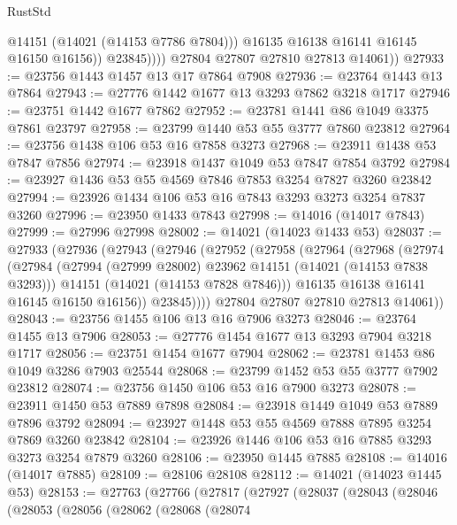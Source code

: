 \begin{lexlean}{RustStd}
\begin{coremodule}
                      @14151
                      (@14021 (@14153 @7786 @7804)))
                    @16135
                    @16138
                    @16141
                    @16145
                    @16150
                    @16156))
                @23845))))
        @27804
        @27807
        @27810
        @27813
        @14061))
@27933 := @23756 @1443 @1457 @13 @17 @7864 @7908
@27936 := @23764 @1443 @13 @7864
@27943 := @27776 @1442 @1677 @13 @3293 @7862 @3218 @1717
@27946 := @23751 @1442 @1677 @7862
@27952 := @23781 @1441 @86 @1049 @3375 @7861 @23797
@27958 := @23799 @1440 @53 @55 @3777 @7860 @23812
@27964 := @23756 @1438 @106 @53 @16 @7858 @3273
@27968 := @23911 @1438 @53 @7847 @7856
@27974 := @23918 @1437 @1049 @53 @7847 @7854 @3792
@27984 := @23927 @1436 @53 @55 @4569 @7846 @7853 @3254 @7827 @3260 @23842
@27994 := @23926 @1434 @106 @53 @16 @7843 @3293 @3273 @3254 @7837 @3260
@27996 := @23950 @1433 @7843
@27998 := @14016 (@14017 @7843)
@27999 := @27996 @27998
@28002 := @14021 (@14023 @1433 @53)
@28037 := @27933
    (@27936
      (@27943
        (@27946
          (@27952
            (@27958
              (@27964
                (@27968
                  (@27974
                    (@27984
                      (@27994 (@27999 @28002) @23962 @14151 (@14021 (@14153 @7838 @3293)))
                      @14151
                      (@14021 (@14153 @7828 @7846)))
                    @16135
                    @16138
                    @16141
                    @16145
                    @16150
                    @16156))
                @23845))))
        @27804
        @27807
        @27810
        @27813
        @14061))
@28043 := @23756 @1455 @106 @13 @16 @7906 @3273
@28046 := @23764 @1455 @13 @7906
@28053 := @27776 @1454 @1677 @13 @3293 @7904 @3218 @1717
@28056 := @23751 @1454 @1677 @7904
@28062 := @23781 @1453 @86 @1049 @3286 @7903 @25544
@28068 := @23799 @1452 @53 @55 @3777 @7902 @23812
@28074 := @23756 @1450 @106 @53 @16 @7900 @3273
@28078 := @23911 @1450 @53 @7889 @7898
@28084 := @23918 @1449 @1049 @53 @7889 @7896 @3792
@28094 := @23927 @1448 @53 @55 @4569 @7888 @7895 @3254 @7869 @3260 @23842
@28104 := @23926 @1446 @106 @53 @16 @7885 @3293 @3273 @3254 @7879 @3260
@28106 := @23950 @1445 @7885
@28108 := @14016 (@14017 @7885)
@28109 := @28106 @28108
@28112 := @14021 (@14023 @1445 @53)
@28153 := @27763
    (@27766
      (@27817
        (@27927
          (@28037
            (@28043
              (@28046
                (@28053
                  (@28056
                    (@28062
                      (@28068
                        (@28074

\end{coremodule}
\end{lexlean}
